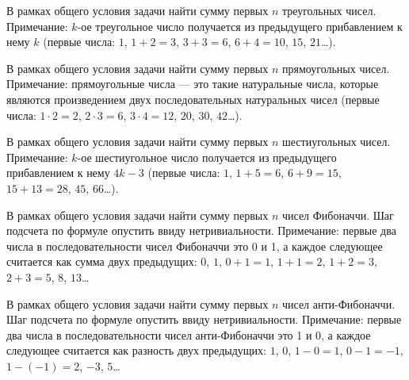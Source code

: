 
\begin{zztask}
В рамках общего условия задачи найти сумму первых $n$ треугольных чисел.
Примечание: $k$-ое треугольное число получается из предыдущего прибавлением
к нему $k$ (первые числа: $1$, $1+2=3$, $3+3=6$, $6+4=10$, $15$, $21$\dots).
\end{zztask}


\begin{zztask}
В рамках общего условия задачи найти сумму первых $n$ прямоугольных чисел.
Примечание: прямоугольные числа --- это такие натуральные числа, которые
являются произведением двух последовательных натуральных чисел
(первые числа: $1\cdot2=2$, $2\cdot3=6$, $3\cdot4=12$, $20$, $30$, $42$\dots).
\end{zztask}


\begin{zztask}
В рамках общего условия задачи найти сумму первых $n$ шестиугольных чисел.
Примечание: $k$-ое шестиугольное число получается из предыдущего прибавлением
к нему $4k-3$ (первые числа: $1$, $1+5=6$, $6+9=15$, $15+13=28$, $45$, $66$\dots).
\end{zztask}


\begin{zztask}
В рамках общего условия задачи найти сумму первых $n$ чисел Фибоначчи.
Шаг подсчета по формуле опустить ввиду нетривиальности. Примечание: первые
два числа в последовательности чисел Фибоначчи это 0 и 1, а каждое следующее
считается как сумма двух предыдущих: $0$, $1$, $0+1=1$, $1+1=2$, $1+2=3$, $2+3=5$,
$8$, $13$\dots
\end{zztask}


\begin{zztask}
В рамках общего условия задачи найти сумму первых $n$ чисел анти-Фибоначчи.
Шаг подсчета по формуле опустить ввиду нетривиальности.  Примечание: первые
два числа в последовательности чисел анти-Фибоначчи это 1 и 0, а каждое
следующее считается как разность двух предыдущих: $1$, $0$, $1-0=1$, $0-1=-1$,
$1-(-1)=2$, $-3$, $5$\dots
\end{zztask}

